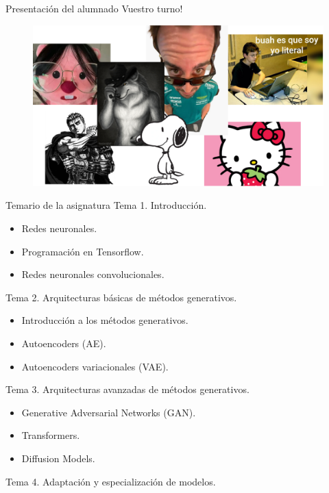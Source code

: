 \begin{frame}{Presentación del alumnado}
\centering \alert{\Large Vuestro turno!}
\begin{figure}
    \centering
    \includegraphics[width=\textwidth]{Slides/figures/Presentacion/Presentacion_Alumnos.png}
\end{figure}
\end{frame}

\begin{frame}[allowframebreaks]{Temario de la asignatura}
\alert{\Large Tema 1. Introducción.}
\begin{itemize}
\item Redes neuronales.
\item Programación en Tensorflow.
\item Redes neuronales convolucionales.
\end{itemize}

\alert{\Large Tema 2. Arquitecturas básicas de métodos generativos.}
\begin{itemize}
\item Introducción a los métodos generativos.
\item Autoencoders (AE).
\item Autoencoders variacionales (VAE).
\end{itemize}

\framebreak

\alert{\Large Tema 3. Arquitecturas avanzadas de métodos generativos.}
\begin{itemize}
\item Generative Adversarial Networks (GAN).
\item Transformers.
\item Diffusion Models.
\end{itemize}

\alert{\Large Tema 4. Adaptación y especialización de modelos.}
\end{frame}

